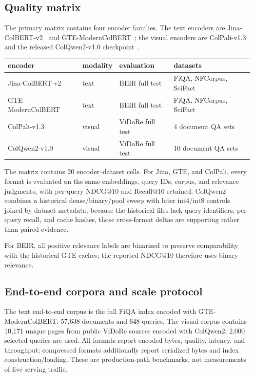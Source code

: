 \documentclass{article}
\makeatletter
\newcommand{\ndcg}{NDCG@10}
\newcommand{\recall}{Recall@10}
\makeatother
\begin{document}
\subsection{Quality matrix}

The primary matrix contains four encoder families. The text encoders are
Jina-ColBERT-v2~\citep{jha2024jina} and
GTE-ModernColBERT~\citep{chaffin2025pylate,chaffin2025gte}; the visual
encoders are ColPali-v1.3~\citep{faysse2025colpali} and the released
ColQwen2-v1.0 checkpoint~\citep{vidore2025colqwen2}.

\begin{center}
\small
\begin{tabular}{llll}
\toprule
encoder & modality & evaluation & datasets \\
\midrule
Jina-ColBERT-v2 & text & BEIR full test & FiQA, NFCorpus, SciFact \\
GTE-ModernColBERT & text & BEIR full test & FiQA, NFCorpus, SciFact \\
ColPali-v1.3 & visual & ViDoRe full test & 4 document QA sets \\
ColQwen2-v1.0 & visual & ViDoRe full test & 10 document QA sets \\
\bottomrule
\end{tabular}
\end{center}

The matrix contains 20 encoder--dataset cells. For Jina, GTE, and ColPali,
every format is evaluated on the same embeddings, query IDs, corpus, and
relevance judgments, with per-query \ndcg{} and \recall{} retained. ColQwen2
combines a historical dense/binary/pool sweep with later int4/int8 controls
joined by dataset metadata; because the historical files lack query
identifiers, per-query recall, and cache hashes, those cross-format deltas are
supporting rather than paired evidence.

For BEIR, all positive relevance labels are binarized to preserve
comparability with the historical GTE caches; the reported \ndcg{} therefore
uses binary relevance.

\subsection{End-to-end corpora and scale protocol}

The text end-to-end corpus is the full FiQA index encoded with
GTE-ModernColBERT: 57,638 documents and 648 queries. The visual corpus
contains 10,171 unique pages from public ViDoRe sources encoded with
ColQwen2; 2,000 selected queries are used. All formats report encoded bytes,
quality, latency, and throughput; compressed formats additionally report
serialized bytes and index construction/loading. These are production-path
benchmarks, not measurements of live serving traffic.
\end{document}

